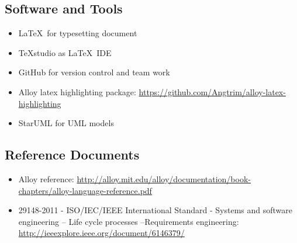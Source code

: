 \subsection{Software and Tools}
	\begin{itemize}
	\item
		\LaTeX\ for typesetting document
	\item
		TeXstudio as \LaTeX\ IDE
	\item
		GitHub for version control and team work
	\item
		Alloy latex highlighting package: \href{https://github.com/Angtrim/alloy-latex-highlighting}{https://github.com/Angtrim/alloy-latex-highlighting}
	\item
		StarUML for UML models
	\end{itemize}
\subsection{Reference Documents}
	\begin{itemize}
		\item Alloy reference:  \href{http://alloy.mit.edu/alloy/documentation/book-chapters/alloy-language-reference.pdf}{http://alloy.mit.edu/alloy/documentation/book-chapters/alloy-language-reference.pdf}
		\item 29148-2011 - ISO/IEC/IEEE International Standard - Systems and software engineering -- Life cycle processes --Requirements engineering: \href{http://ieeexplore.ieee.org/document/6146379/}{http://ieeexplore.ieee.org/document/6146379/}
	\end{itemize}